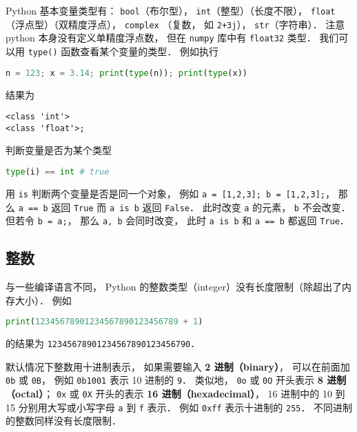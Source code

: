 
\begin{issues}
\issueDraft
\end{issues}


Python 基本变量类型有： \verb|bool|（布尔型）， \verb|int|（整型）（长度不限）， \verb|float|（浮点型）（双精度浮点）， \verb|complex| （复数， 如 \verb|2+3j|）， \verb|str|（字符串）． 注意 python 本身没有定义单精度浮点数， 但在 \verb|numpy| 库中有 \verb|float32| 类型． 我们可以用 \verb|type()| 函数查看某个变量的类型． 例如执行
\begin{lstlisting}[language=python]
n = 123; x = 3.14; print(type(n)); print(type(x))
\end{lstlisting}
结果为
\begin{lstlisting}
<class 'int'>
<class 'float'>;
\end{lstlisting}
判断变量是否为某个类型
\begin{lstlisting}[language=python]
type(i) == int # true
\end{lstlisting}

用 \verb|is| 判断两个变量是否是同一个对象， 例如 \verb|a = [1,2,3]; b = [1,2,3];|， 那么 \verb|a == b| 返回 \verb|True| 而 \verb|a is b| 返回 \verb|False|． 此时改变 \verb|a| 的元素， \verb|b| 不会改变． 但若令 \verb|b = a;|， 那么 \verb|a, b| 会同时改变， 此时 \verb|a is b| 和 \verb|a == b| 都返回 \verb|True|．

\subsection{整数}
与一些编译语言不同， Python 的整数类型（integer）没有长度限制（除超出了内存大小）． 例如
\begin{lstlisting}[language=python]
print(12345678901234567890123456789 + 1)
\end{lstlisting}
的结果为 \verb|12345678901234567890123456790|．

默认情况下整数用十进制表示， 如果需要输入 \textbf{2 进制（binary）}， 可以在前面加 \verb|0b| 或 \verb|0B|， 例如 \verb|0b1001| 表示 10 进制的 \verb|9|． 类似地， \verb|0o| 或 \verb|0O| 开头表示 \textbf{8 进制（octal）}； \verb|0x| 或 \verb|0X| 开头的表示 \textbf{16 进制（hexadecimal）}， 16 进制中的 10 到 15 分别用大写或小写字母 \verb|a| 到 \verb|f| 表示． 例如 \verb|0xff| 表示十进制的 \verb|255|． 不同进制的整数同样没有长度限制．

